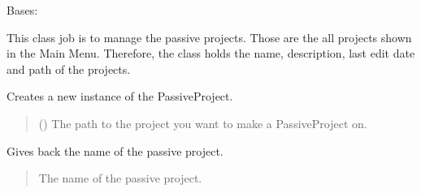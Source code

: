 \documentclass[letterpaper,10pt,english]{sphinxmanual}
\begin{document}
\begin{fulllineitems}
\label{\detokenize{apidoc/src.osm_configurator.model.application:src.osm_configurator.model.application.passive_project.PassiveProject}}
\pysigstartsignatures
{}
\pysigstopsignatures
\sphinxAtStartPar
Bases: 

\sphinxAtStartPar
This class job is to manage the passive projects. Those are the all projects shown in the Main Menu. Therefore,
the class holds the name, description, last edit date and path of the projects.

\begin{fulllineitems}
\label{\detokenize{apidoc/src.osm_configurator.model.application:src.osm_configurator.model.application.passive_project.PassiveProject.__init__}}
\pysigstartsignatures
{}
\pysigstopsignatures
\sphinxAtStartPar
Creates a new instance of the PassiveProject.
\begin{quote}\begin{description}
\sphinxAtStartPar
{} () \textendash{} The path to the project you want to make a PassiveProject on.

\end{description}\end{quote}

\end{fulllineitems}


\begin{fulllineitems}
\label{\detokenize{apidoc/src.osm_configurator.model.application:src.osm_configurator.model.application.passive_project.PassiveProject.get_name}}
\pysigstartsignatures
{}
\pysigstopsignatures
\sphinxAtStartPar
Gives back the name of the passive project.
\begin{quote}\begin{description}
\sphinxAtStartPar
The name of the passive project.


\end{description}
\end{quote}
\end{fulllineitems}
\end{fulllineitems}
\end{document}

